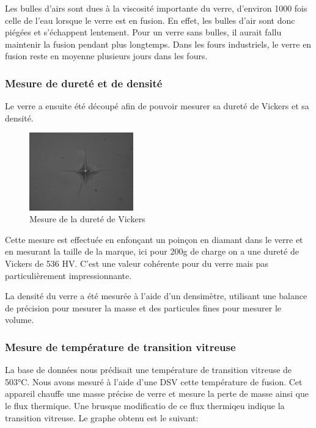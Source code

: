 \documentclass{article}
\begin{document}
Les bulles d'airs sont dues à la viscosité importante du verre, d'environ 1000 fois celle de l'eau lorsque le verre est en fusion. En effet, les bulles d'air sont donc piégées et s'échappent lentement. Pour un verre sans bulles, il aurait fallu maintenir la fusion pendant plus longtemps. Dans les fours industriels, le verre en fusion reste en moyenne plusieurs jours dans les fours.

\subsubsection{Mesure de dureté et de densité}

Le verre a ensuite été découpé afin de pouvoir mesurer sa dureté de Vickers et sa densité. 


\begin{figure}[ht]
    \centering
    \includegraphics[width=0.4\textwidth]{photos/dureté.jpg}
    \caption{Mesure de la dureté de Vickers}
\end{figure}

Cette mesure est effectuée en enfonçant un poinçon en diamant dans le verre et en mesurant la taille de la marque, ici pour 200g de charge on a une dureté de Vickers de 536 HV. C'est une valeur cohérente pour du verre mais pas particulièrement impressionnante.


La densité du verre a été mesurée à l'aide d'un densimètre, utilisant une balance de précision pour mesurer la masse et des particules fines pour mesurer le volume. 

\subsubsection{Mesure de température de transition vitreuse}

La base de données nous prédisait une température de transition vitreuse de 503°C. Nous avons mesuré à l'aide d'une DSV cette température de fusion. Cet appareil chauffe une masse précise de verre et mesure la perte de masse ainsi que le flux thermique. Une brusque modificatio de ce flux thermiqeu indique la transition vitreuse.
Le graphe obtenu est le suivant:
\end{document}
